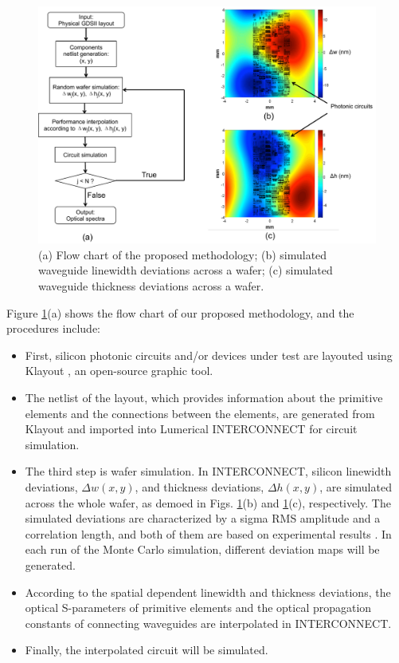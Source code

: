 \begin{figure}[h]
    \centering
    \label{flow_chart}\includegraphics[width=13cm]{flow_chart.pdf}
    \vspace{-10pt}
    \caption{(a) Flow chart of the proposed methodology; (b) simulated waveguide linewidth deviations across a wafer; (c) simulated waveguide thickness deviations across a wafer.}
    \label{flow_chart}  
\end{figure}

Figure \ref{flow_chart}(a) shows the flow chart of our proposed methodology, and the procedures include: 
\begin{itemize}
\item First, silicon photonic circuits and/or devices under test are layouted using Klayout \cite{www_klayout}, an open-source graphic tool. 
\item
The netlist of the layout, which provides information about the primitive elements and the connections between the elements, are generated from Klayout and imported into Lumerical INTERCONNECT \cite{lumericalINTERCONNECT} for circuit simulation. 
\item
The third step is wafer simulation. In INTERCONNECT, silicon linewidth deviations, $\Delta w(x,y)$, and thickness deviations, $\Delta h(x,y)$, are simulated across the whole wafer, as demoed in Figs. \ref{flow_chart}(b) and \ref{flow_chart}(c), respectively. The simulated deviations are characterized by a sigma RMS amplitude and a correlation length, and both of them are based on experimental results \cite{NRCreview, hochberg14:wafer}. In each run of the Monte Carlo simulation, different deviation maps will be generated. 
\item
According to the spatial dependent linewidth and thickness deviations, the optical S-parameters of primitive elements and the optical propagation constants of connecting waveguides are interpolated in INTERCONNECT. 
\item
Finally, the interpolated circuit will be simulated. 
\end{itemize}

